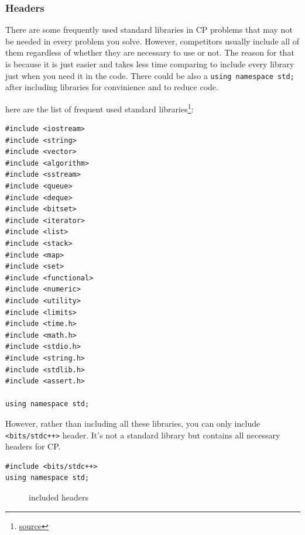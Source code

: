 \documentclass[12pt, a4paper]{article}
\begin{document}
\subsubsection{Headers}
There are some frequently used standard libraries in CP problems that may not be needed in every problem you solve. However, competitors usually include all of them regardless of whether they are necessary to use or not. The reason for that is because it is just easier and takes less time comparing to include every library just when you need it in the code. There could be also a \lstinline{using namespace std;} after including libraries for convinience and to reduce code.

here are the list of frequent used standard libraries\footnote{\href{https://gist.github.com/kodekracker/e09f9d23573f117a5db0}{source}}:

\begin{lstlisting}
#include <iostream>
#include <string>
#include <vector>
#include <algorithm>
#include <sstream>
#include <queue>
#include <deque>
#include <bitset>
#include <iterator>
#include <list>
#include <stack>
#include <map>
#include <set>
#include <functional>
#include <numeric>
#include <utility>
#include <limits>
#include <time.h>
#include <math.h>
#include <stdio.h>
#include <string.h>
#include <stdlib.h>
#include <assert.h>

using namespace std;
\end{lstlisting}

However, rather than including all these libraries, you can only include \lstinline{<bits/stdc++>} header. It's not a standard library but contains all necessary headers for CP.

\begin{lstlisting}
#include <bits/stdc++>
using namespace std;
\end{lstlisting}

\begin{figure}[H]
\centering
{}
\caption{included headers}
\end{figure}
\end{document}
